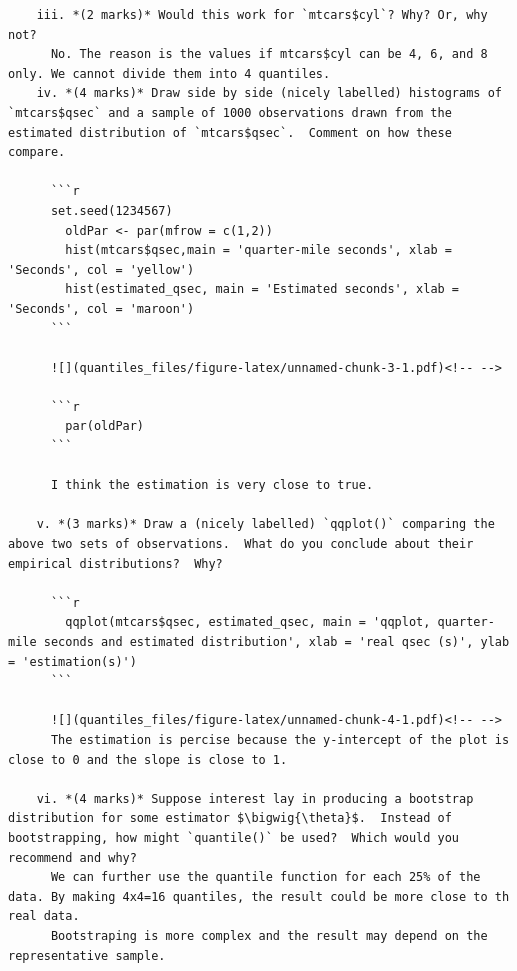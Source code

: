 \documentclass[
  9pt,
]{article}
\newcommand{\bigwig}[1]{\widetilde{#1}}
\begin{document}
\begin{verbatim}
    iii. *(2 marks)* Would this work for `mtcars$cyl`? Why? Or, why not?
      No. The reason is the values if mtcars$cyl can be 4, 6, and 8 only. We cannot divide them into 4 quantiles.
    iv. *(4 marks)* Draw side by side (nicely labelled) histograms of `mtcars$qsec` and a sample of 1000 observations drawn from the estimated distribution of `mtcars$qsec`.  Comment on how these compare.
      
      ```r
      set.seed(1234567)
        oldPar <- par(mfrow = c(1,2))
        hist(mtcars$qsec,main = 'quarter-mile seconds', xlab = 'Seconds', col = 'yellow')
        hist(estimated_qsec, main = 'Estimated seconds', xlab = 'Seconds', col = 'maroon')
      ```
      
      ![](quantiles_files/figure-latex/unnamed-chunk-3-1.pdf)<!-- --> 
      
      ```r
        par(oldPar) 
      ```
      
      I think the estimation is very close to true.
    
    v. *(3 marks)* Draw a (nicely labelled) `qqplot()` comparing the above two sets of observations.  What do you conclude about their empirical distributions?  Why?
      
      ```r
        qqplot(mtcars$qsec, estimated_qsec, main = 'qqplot, quarter-mile seconds and estimated distribution', xlab = 'real qsec (s)', ylab = 'estimation(s)')
      ```
      
      ![](quantiles_files/figure-latex/unnamed-chunk-4-1.pdf)<!-- --> 
      The estimation is percise because the y-intercept of the plot is close to 0 and the slope is close to 1.

    vi. *(4 marks)* Suppose interest lay in producing a bootstrap distribution for some estimator $\bigwig{\theta}$.  Instead of bootstrapping, how might `quantile()` be used?  Which would you recommend and why?
      We can further use the quantile function for each 25% of the data. By making 4x4=16 quantiles, the result could be more close to th real data.
      Bootstraping is more complex and the result may depend on the representative sample.
\end{verbatim}
\end{document}
